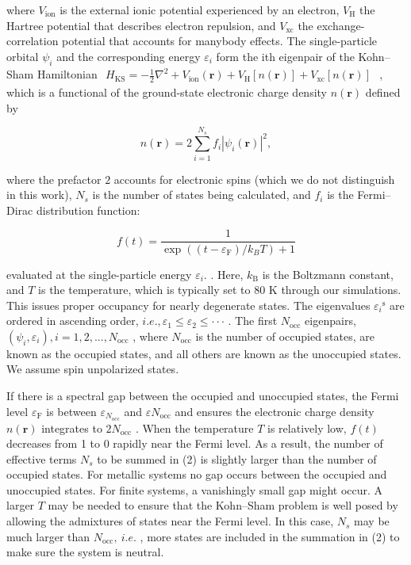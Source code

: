 \documentclass[
  10
]{article}
\begin{document}
where \(V _ { \mathrm { i o n } }\) is the external ionic potential
experienced by an electron, \(V _ { \mathrm { H } }\) the Hartree
potential that describes electron repulsion, and
\(V _ { \mathrm { x c } }\) the exchange-correlation potential that
accounts for manybody effects. The single-particle orbital
\(\psi _ { i }\) and the corresponding energy \(\varepsilon _ { i }\)
form the ith eigenpair of the Kohn--Sham Hamiltonian
\(\begin{array} { r } { H _ { \mathrm { K S } } = - \frac { 1 } { 2 } \nabla ^ { 2 } + V _ { \mathrm { i o n } } ( \mathbf { r } ) + V _ { \mathrm { H } } [ n ( \mathbf { r } ) ] + V _ { \mathrm { x c } } [ n ( \mathbf { r } ) ] } \end{array}\)
, which is a functional of the ground-state electronic charge density
\(n ( \mathbf { r } )\) defined by

\[
n (\mathbf {r}) = 2 \sum_ {i = 1} ^ {N _ {s}} f _ {i} | \psi_ {i} (\mathbf {r}) | ^ {2}, \tag {2}
\]

where the prefactor \(2\) accounts for electronic spins (which we do not
distinguish in this work), \(N _ { s }\) is the number of states being
calculated, and \(f _ { i }\) is the Fermi--Dirac distribution function:

\[
f (t) = \frac {1}{\exp ((t - \varepsilon_ {\mathrm{F}}) / k _ {B} T) + 1} \tag {3}
\]

evaluated at the single-particle energy \(\varepsilon _ { i } .\) .
Here, \(k _ { \mathrm { B } }\) is the Boltzmann constant, and \(T\) is
the temperature, which is typically set to 80 K through our simulations.
This issues proper occupancy for nearly degenerate states. The
eigenvalues \(\varepsilon _ { i } \mathrm { { ^ { s } } }\) are ordered
in ascending order,
\(i . e . , \varepsilon _ { 1 } \leq \varepsilon _ { 2 } \leq \cdot \cdot \cdot\)
. The first \(N _ { \mathrm { o c c } }\) eigenpairs,
\(( \psi _ { i } , \varepsilon _ { i } ) , i = 1 , 2 , . . . , N _ { \mathrm { o c c } }\)
, where \(N _ { \mathrm { o c c } }\) is the number of occupied states,
are known as the occupied states, and all others are known as the
unoccupied states. We assume spin unpolarized states.

If there is a spectral gap between the occupied and unoccupied states,
the Fermi level \(\varepsilon _ { \mathrm { F } }\) is between
\(\varepsilon _ { N _ { \mathrm { o c c } } }\) and
\(\varepsilon N _ { \mathrm { o c c } }\) and ensures the electronic
charge density \(n ( \mathbf { r } )\) integrates to
\(2 N _ { \mathrm { o c c } }\) . When the temperature \(T\) is
relatively low, \(f ( t )\) decreases from 1 to 0 rapidly near the Fermi
level. As a result, the number of effective terms \(N _ { s }\) to be
summed in (2) is slightly larger than the number of occupied states. For
metallic systems no gap occurs between the occupied and unoccupied
states. For finite systems, a vanishingly small gap might occur. A
larger \(T\) may be needed to ensure that the Kohn--Sham problem is well
posed by allowing the admixtures of states near the Fermi level. In this
case, \(N _ { s }\) may be much larger than
\(N _ { \mathrm { o c c } } , \ i . e .\) , more states are included in
the summation in (2) to make sure the system is neutral.
\end{document}
